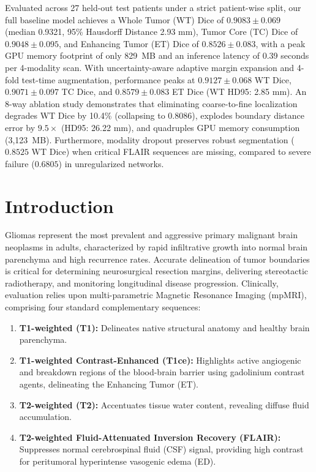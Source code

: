 \documentclass[12pt, a4paper]{article}
\begin{document}
Evaluated across 27 held-out test patients under a strict patient-wise split, our full baseline model achieves a Whole Tumor (WT) Dice of $0.9083 \pm 0.069$ (median 0.9321, 95\% Hausdorff Distance 2.93 mm), Tumor Core (TC) Dice of $0.9048 \pm 0.095$, and Enhancing Tumor (ET) Dice of $0.8526 \pm 0.083$, with a peak GPU memory footprint of only 829~MB and an inference latency of 0.39 seconds per 4-modality scan. With uncertainty-aware adaptive margin expansion and 4-fold test-time augmentation, performance peaks at $0.9127 \pm 0.068$ WT Dice, $0.9071 \pm 0.097$ TC Dice, and $0.8579 \pm 0.083$ ET Dice (WT HD95: 2.85 mm). An 8-way ablation study demonstrates that eliminating coarse-to-fine localization degrades WT Dice by 10.4\% (collapsing to 0.8086), explodes boundary distance error by $9.5\times$ (HD95: 26.22 mm), and quadruples GPU memory consumption (3,123~MB). Furthermore, modality dropout preserves robust segmentation ($0.8525$ WT Dice) when critical FLAIR sequences are missing, compared to severe failure ($0.6805$) in unregularized networks.

\section{Introduction}

Gliomas represent the most prevalent and aggressive primary malignant brain neoplasms in adults, characterized by rapid infiltrative growth into normal brain parenchyma and high recurrence rates. Accurate delineation of tumor boundaries is critical for determining neurosurgical resection margins, delivering stereotactic radiotherapy, and monitoring longitudinal disease progression. Clinically, evaluation relies upon multi-parametric Magnetic Resonance Imaging (mpMRI), comprising four standard complementary sequences:
\begin{enumerate}[leftmargin=*, itemsep=4pt]
    \item \textbf{T1-weighted (T1):} Delineates native structural anatomy and healthy brain parenchyma.
    \item \textbf{T1-weighted Contrast-Enhanced (T1ce):} Highlights active angiogenic and breakdown regions of the blood-brain barrier using gadolinium contrast agents, delineating the Enhancing Tumor (ET).
    \item \textbf{T2-weighted (T2):} Accentuates tissue water content, revealing diffuse fluid accumulation.
    \item \textbf{T2-weighted Fluid-Attenuated Inversion Recovery (FLAIR):} Suppresses normal cerebrospinal fluid (CSF) signal, providing high contrast for peritumoral hyperintense vasogenic edema (ED).
\end{enumerate}
\end{document}
